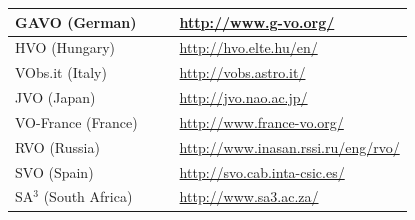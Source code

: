 \begin{table}
\begin{tabular}{|l|l|l|l|}
	\hline
	GAVO (German) & &  & \url{http://www.g-vo.org/} \\
	\hline
	HVO (Hungary) & & & \url{http://hvo.elte.hu/en/} \\
	\hline
	VObs.it (Italy) & & & \url{http://vobs.astro.it/} \\
	\hline
	JVO (Japan) & & & \url{http://jvo.nao.ac.jp/}\\
	\hline
	VO-France (France) & & & \url{http://www.france-vo.org/} \\
	\hline
	RVO (Russia) & & & \url{http://www.inasan.rssi.ru/eng/rvo/} \\
	\hline
	SVO (Spain) & & & \url{http://svo.cab.inta-csic.es/} \\
	\hline
	SA$^3$ (South Africa) & & & \url{http://www.sa3.ac.za/} \\

\end{tabular}
\end{table}
